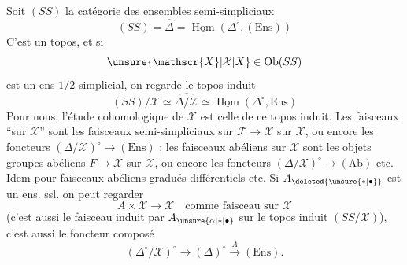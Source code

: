 Soit $(SS)$ la catégorie des ensembles semi-simpliciaux
\[
 (SS)=\widehat{\mathbb{\Delta}}=\underline{\operatorname{Hom}}(\mathbb{\Delta}^{\circ},(\mathrm{Ens}))
\]
C'est un topos, et si
\[
 \unsure{\mathscr{X}|\mathcal{X}|X}\in\operatorname{Ob}(SS)
\]
est un ens $1/2$ simplicial, on regarde le topos induit
\[
 (SS)/\mathscr{X}\simeq\widehat{\mathbb{\Delta}/\mathscr{X}}\simeq
 \underline{\operatorname{Hom}}(\mathbb{\Delta}^\circ,\mathrm{Ens})
\]
Pour nous, l'étude cohomologique de $\mathscr{X}$ est celle de ce topos induit. Les faisceaux  ``sur $\mathscr{X}$'' sont les  faisceaux semi-simpliciaux sur $\mathscr{F}\to\mathscr{X}$ sur $\mathscr{X}$, ou encore les foncteurs $(\mathbb{\Delta}/\mathscr{X})^\circ\to(\mathrm{Ens})$ ; les faisceaux abéliens sur $\mathscr{X}$ sont les objets groupes abéliens $F\to\mathscr{X}$ sur $\mathscr{X}$, ou encore les foncteurs $(\mathbb{\Delta}/\mathscr{X})^\circ\to(\mathrm{Ab})$ etc. Idem pour faisceaux abéliens gradués différentiels etc. Si $A_{\deleted{\unsure{*|\bullet}}}$ est un ens. ssl. on peut regarder
\[
 A\times\mathscr{X}\longrightarrow\mathscr{X}\quad\text{comme faisceau sur }\mathscr{X}
\]
(c'est aussi le faisceau induit par $A_{\unsure{\alpha|*|\bullet}}$ sur le topos induit $(SS/\mathscr{X})$), c'est aussi le foncteur composé
\[
 (\mathbb{\Delta}^{\circ}/\mathscr{X})^\circ\longrightarrow
 (\mathbb{\Delta})^\circ\xrightarrow{A}(\mathrm{Ens}).
\]

